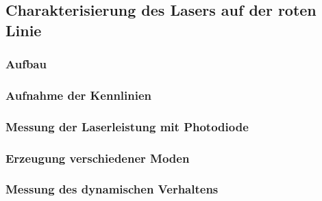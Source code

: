 \subsection{Charakterisierung des Lasers auf der roten Linie}

\subsubsection{Aufbau}



\subsubsection{Aufnahme der Kennlinien}



\subsubsection{Messung der Laserleistung mit Photodiode}



\subsubsection{Erzeugung verschiedener Moden}


\subsubsection{Messung des dynamischen Verhaltens}